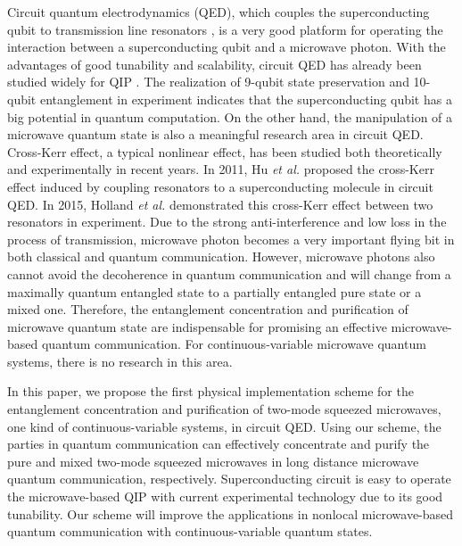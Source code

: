\documentclass[preprintnumbers,showkeys,amsmath,amssymb]{revtex4}%
\begin{document}
Circuit quantum electrodynamics (QED), which couples the
superconducting qubit to transmission line resonators \cite{ABlais},
is a very good platform for operating the interaction between a
superconducting qubit and a microwave photon. With the advantages of
good tunability and scalability, circuit QED has already been
studied widely for QIP
\cite{ABlais2,DiCarlo,LongcircuitPRA,Wangsuperconducting,circuitTianlPRL,3q,3q1,MHofheinz,
DISchuster,BRJohnson,CPYangPRA2013,HuaMPRA,SongXK1,SongXK2,zhaopra053,Kellynature66,CSong10bit}.
The realization of 9-qubit state preservation \cite{Kellynature66}
and 10-qubit \cite{CSong10bit} entanglement in experiment indicates
that the superconducting qubit has a big potential in quantum
computation. On the other hand, the manipulation of a microwave
quantum state is also a meaningful research area in circuit QED.
Cross-Kerr effect, a typical nonlinear effect, has been studied both
theoretically \cite{SRebic2009,YHu,TLiuQIP} and experimentally
\cite{ICHoi,ETHolland} in recent years. In 2011, Hu \emph{et al.}
\cite{YHu} proposed the cross-Kerr effect induced by coupling
resonators to a superconducting molecule in circuit QED. In 2015,
Holland \emph{et al.} \cite{ETHolland} demonstrated this cross-Kerr
effect between two resonators in experiment. Due to the strong
anti-interference and low loss in the process of transmission,
microwave photon becomes a very important flying bit in both
classical and quantum communication. However, microwave photons also
cannot avoid the decoherence in quantum communication and will
change from a maximally quantum entangled state to a partially
entangled pure state or a mixed one. Therefore, the entanglement
concentration and purification of microwave quantum state are
indispensable for promising an effective microwave-based quantum
communication. For continuous-variable microwave quantum systems,
there is no research in this area.



In this paper, we propose the first physical implementation scheme
for the entanglement concentration and purification of two-mode
squeezed microwaves, one kind of continuous-variable systems, in
circuit QED. Using our scheme, the parties in quantum communication
can effectively concentrate and purify the pure and mixed two-mode
squeezed microwaves in long distance microwave quantum
communication, respectively. Superconducting
circuit is easy to operate the microwave-based QIP with current
experimental technology due to its good tunability. Our scheme will
improve the applications in nonlocal microwave-based quantum
communication with continuous-variable quantum states.
\end{document}
